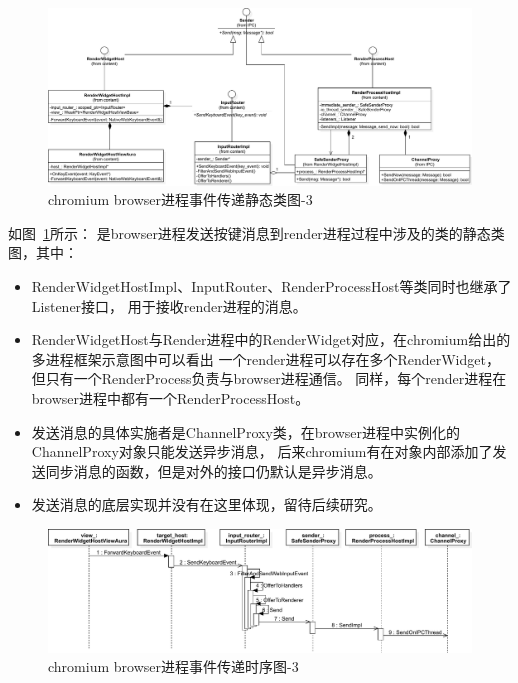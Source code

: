 \begin{figure}[H] 
  \centering 
  \includegraphics[width=\textwidth]{image/event_study/browser_event_dispatch_class_3.pdf} 
  \caption{chromium browser进程事件传递静态类图-3} \label{fig:browser_event_dispatch_class_3} 
\end{figure}

如图~\ref{fig:browser_event_dispatch_class_3}所示：
是browser进程发送按键消息到render进程过程中涉及的类的静态类图，其中：
\begin{itemize}
  \item RenderWidgetHostImpl、InputRouter、RenderProcessHost等类同时也继承了Listener接口，
  用于接收render进程的消息。
  \item RenderWidgetHost与Render进程中的RenderWidget对应，在chromium给出的多进程框架示意图中可以看出
  一个render进程可以存在多个RenderWidget，但只有一个RenderProcess负责与browser进程通信。
  同样，每个render进程在browser进程中都有一个RenderProcessHost。
  \item 发送消息的具体实施者是ChannelProxy类，在browser进程中实例化的ChannelProxy对象只能发送异步消息，
  后来chromium有在对象内部添加了发送同步消息的函数，但是对外的接口仍默认是异步消息。
  \item 发送消息的底层实现并没有在这里体现，留待后续研究。
\end{itemize}

\newpage
\begin{figure}[H] 
  \centering 
  \includegraphics[width=\textwidth]{image/event_study/browser_event_dispatch_sequence_3.pdf} 
  \caption{chromium browser进程事件传递时序图-3} \label{fig:browser_event_dispatch_sequence_3} 
\end{figure}

